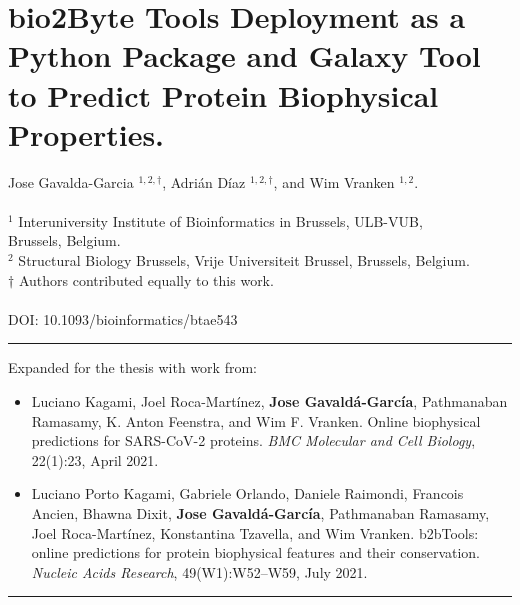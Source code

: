 \chapter[\texorpdfstring{bio2Byte Tools Deployment as a Python Package and Galaxy Tool to Predict Protein Biophysical Properties}{bio2Byte Tools Deployment as a Python Package and Galaxy Tool to Predict Protein Biophysical Properties}]{bio2Byte Tools Deployment as a Python Package and Galaxy Tool to Predict Protein Biophysical Properties.}\label{chapter:b2btools_deployment}

Jose Gavalda-Garcia $^{1,2,\dag}$, Adrián Díaz $^{1,2,\dag}$, and Wim Vranken $^{1,2}$.
\\
\\
$^{1}$ Interuniversity Institute of Bioinformatics in Brussels, ULB-VUB, \\Brussels, Belgium.
\\
$^{2}$ Structural Biology Brussels, Vrije Universiteit Brussel, Brussels, Belgium.
\\
$\dag$ Authors contributed equally to this work.
\\
\\
DOI: 10.1093/bioinformatics/btae543
\vspace{1em}
\hrule
\vspace{1em}
\noindent Expanded for the thesis with work from: 
\begin{itemize}

\item Luciano Kagami, Joel Roca-Martínez, \textbf{Jose Gavaldá-García}, Pathmanaban Ramasamy, K. Anton Feenstra, and Wim F. Vranken. Online biophysical predictions for SARS-CoV-2 proteins. \textit{BMC Molecular and Cell Biology}, 22(1):23, April 2021.

\item Luciano Porto Kagami, Gabriele Orlando, Daniele Raimondi, Francois Ancien, Bhawna Dixit, \textbf{Jose Gavaldá-García}, Pathmanaban Ramasamy, Joel Roca-Martínez, Konstantina Tzavella, and Wim Vranken. b2bTools: online predictions for protein biophysical features and their conservation. \textit{Nucleic Acids Research}, 49(W1):W52–W59, July 2021.

\end{itemize}
\vspace{1em}
\hrule
\vspace{1em}
